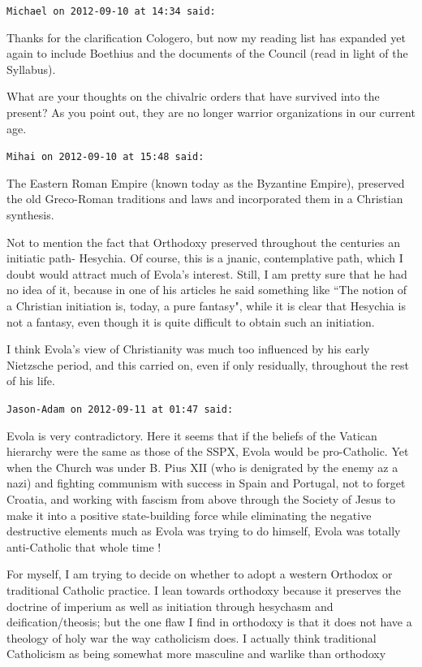 \begin{footnotesize}
\begin{sffamily}
\hfill

\texttt{Michael on 2012-09-10 at 14:34 said: }

Thanks for the clarification Cologero, but now my reading list has expanded yet again to include Boethius and the documents of the Council (read in light of the Syllabus).

What are your thoughts on the chivalric orders that have survived into the present? As you point out, they are no longer warrior organizations in our current age.


\hfill

\texttt{Mihai on 2012-09-10 at 15:48 said: }

The Eastern Roman Empire (known today as the Byzantine Empire), preserved the old Greco-Roman traditions and laws and incorporated them in a Christian synthesis. 

Not to mention the fact that Orthodoxy preserved throughout the centuries an initiatic path- Hesychia. Of course, this is a jnanic, contemplative path, which I doubt would attract much of Evola's interest. Still, I am pretty sure that he had no idea of it, because in one of his articles he said something like ``The notion of a Christian initiation is, today, a pure fantasy", while it is clear that Hesychia is not a fantasy, even though it is quite difficult to obtain such an initiation. 

I think Evola's view of Christianity was much too influenced by his early Nietzsche period, and this carried on, even if only residually, throughout the rest of his life.


\hfill

\texttt{Jason-Adam on 2012-09-11 at 01:47 said: }

Evola is very contradictory. Here it seems that if the beliefs of the Vatican hierarchy were the same as those of the SSPX, Evola would be pro-Catholic. Yet when the Church was under B. Pius XII (who is denigrated by the enemy az a nazi) and fighting communism with success in Spain and Portugal, not to forget Croatia, and working with fascism from above through the Society of Jesus to make it into a positive state-building force while eliminating the negative destructive elements much as Evola was trying to do himself, Evola was totally anti-Catholic that whole time !

For myself, I am trying to decide on whether to adopt a western Orthodox or traditional Catholic practice. I lean towards orthodoxy because it preserves the doctrine of imperium as well as initiation through hesychasm and deification/theosis; but the one flaw I find in orthodoxy is that it does not have a theology of holy war the way catholicism does. I actually think traditional Catholicism as being somewhat more masculine and warlike than orthodoxy 


\end{sffamily}
\end{footnotesize}
